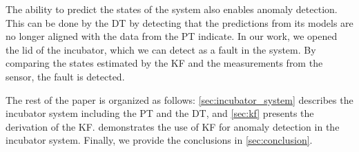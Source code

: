 The ability to predict the states of the system also enables anomaly detection. This can be done by the DT by detecting that the predictions from its models are no longer aligned with the data from the PT indicate.
In our work, we opened the lid of the incubator, which we can detect as a fault in the system. 
By comparing the states estimated by the KF and the measurements from the sensor, the fault is detected.

The rest of the paper is organized as follows: \cref{sec:incubator_system} describes the incubator system including the PT and the DT, and \cref{sec:kf} presents the derivation of the KF.  demonstrates the use of KF for anomaly detection in the incubator system. Finally, we provide the conclusions in \cref{sec:conclusion}.
